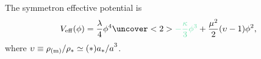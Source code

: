 \begin{frame}[plain]%
    \begin{columns}   
    \begin{column}{0.5\textwidth}\small
        
        The \textcolor{B2}{symmetron} %
        effective potential is
        \begin{multline}
            V\ped{eff}(\phi) = \frac{\lambda}{4}\phi^4 \uncover<2>{\mathcolor{G2}{-\frac{\kappa}{3}\phi^3}} 
            + \frac{\mu^2}{2} \pclosed{\upsilon-1}\phi^2,
        \end{multline}
        where $\upsilon\equiv \rho_\mathrm{(m)}/\rho_\ast \simeq {\left( * \right)}{a_\ast/a}^3$.%


\end{column}
\end{columns}
\end{frame}
